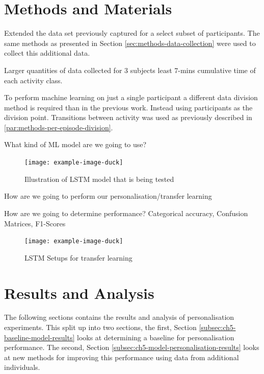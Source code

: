 \section{Methods and Materials}
Extended the data set previously captured for a select subset of participants. The same methods as presented in Section \ref{sec:methods-data-collection} were used to collect this additional data.

Larger quantities of data collected for 3 subjects least 7-mins cumulative time of each activity class. 

To perform machine learning on just a single participant a different data division method is required than in the previous work. Instead using participants as the division point. Transitions between activity was used as previously described in \ref{par:methods-per-episode-division}.

What kind of ML model are we going to use?
\begin{figure}[htbp]
    \centering
    \texttt{[image: example-image-duck]}
    \caption{Illustration of LSTM model that is being tested}
    \label{fig:ch5_illustration_of_base_LSTM_model}
\end{figure}


How are we going to perform our personalisation/transfer learning


How are we going to determine performance? Categorical accuracy, Confusion Matrices, F1-Scores

\begin{figure}[htbp]
    \centering
    \texttt{[image: example-image-duck]}
    \caption{LSTM Setups for transfer learning}
    \label{fig:ch5_LSTM_model_transfer_learning}
\end{figure}



\section{Results and Analysis}
The following sections contains the results and analysis of personalisation experiments. This split up into two sections, the first, Section \ref{subsec:ch5-baseline-model-results} looks at determining a baseline for personalisation performance. The second, Section \ref{subsec:ch5-model-personalisation-results} looks at new methods for improving this performance using data from additional individuals.

